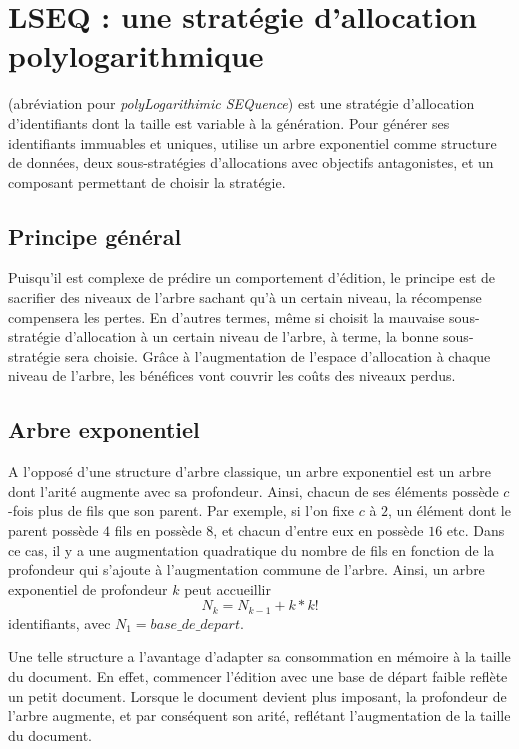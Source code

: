 
\section{LSEQ : une stratégie d'allocation polylogarithmique}

\LSEQ (abréviation pour \emph{polyLogarithimic SEQuence}) est une stratégie
d'allocation d'identifiants dont la taille est variable à la génération. Pour
générer ses identifiants immuables et uniques, \LSEQ utilise un arbre
exponentiel comme structure de données, deux sous-stratégies d'allocations avec
objectifs antagonistes, et un composant permettant de choisir la stratégie.

\subsection{Principe général}

Puisqu'il est complexe de prédire un comportement d'édition, le principe est de
sacrifier des niveaux de l'arbre sachant qu'à un certain niveau, la récompense
compensera les pertes. En d'autres termes, même si \LSEQ choisit la mauvaise
sous-stratégie d'allocation à un certain niveau de l'arbre, à terme, la bonne
sous-stratégie sera choisie. Grâce à l'augmentation de l'espace d'allocation à
chaque niveau de l'arbre, les bénéfices vont couvrir les coûts des niveaux
perdus.


\subsection{Arbre exponentiel}

A l'opposé d'une structure d'arbre classique, un arbre exponentiel est un arbre
dont l'arité augmente avec sa profondeur. Ainsi, chacun de ses éléments possède
$c$-fois plus de fils que son parent. Par exemple, si l'on fixe $c$ à $2$, un
élément dont le parent possède $4$ fils en possède $8$, et chacun d'entre eux en
possède $16$ etc. Dans ce cas, il y a une augmentation quadratique du nombre de
fils en fonction de la profondeur qui s'ajoute à l'augmentation commune de
l'arbre. Ainsi, un arbre exponentiel de profondeur $k$ peut accueillir 
\begin{equation}
  N_k = N_{k-1} + k * k!
\end{equation}
identifiants, avec $N_1 = base\_de\_depart$.



Une telle structure a l'avantage d'adapter sa consommation en mémoire à la
taille du document. En effet, commencer l'édition avec une base de départ faible
reflète un petit document. Lorsque le document devient plus imposant, la
profondeur de l'arbre augmente, et par conséquent son arité, reflétant
l'augmentation de la taille du document.

